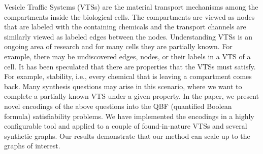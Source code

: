 Vesicle Traffic Systems (VTSs) are the material transport 
mechanisms among the compartments inside the biological cells.
%
The compartments are viewed as nodes that are labeled with the
containing chemicals and the transport channels
are similarly viewed as labeled edges between the nodes.
%
Understanding VTSs is an ongoing area of research and for many cells
they are partially known.
%
For example, there may be undiscovered edges, nodes, or their labels
in a VTS of a cell.
%
It has been speculated that there are properties that the VTSs must
satisfy.
%
For example, stability, i.e., every chemical that is leaving a
compartment comes back.
%
Many synthesis questions may arise in this scenario, where we want
to complete a partially known VTS under a given property.
%
In the paper, we present novel encodings of the above questions
into the QBF (quantified Boolean formula) satisfiability problems.
%
We have implemented the encodings in a highly configurable tool
and applied to a couple of found-in-nature VTSs and 
several synthetic graphs.
%
Our results demonstrate that our method can scale up to the graphs of interest.
%
%

